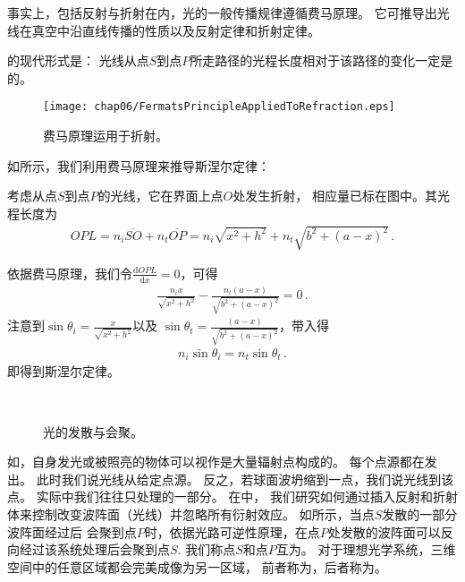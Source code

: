 事实上，包括反射与折射在内，光的一般传播规律遵循费马原理。
它可推导出光线在真空中沿直线传播的性质以及反射定律和折射定律。
\begin{proposition}
    的现代形式是：
    光线从点$S$到点$P$所走路径的光程长度相对于该路径的变化一定是的。
\end{proposition}

\begin{figure}[htbp]
    \centering\texttt{[image: chap06/FermatsPrincipleAppliedToRefraction.eps]}
    \caption{费马原理运用于折射。}
    \label{fig:6.28}
\end{figure}

如所示，我们利用费马原理来推导斯涅尔定律：
\begin{prove}\label{prove:FermatSnell}
    考虑从点$S$到点$P$的光线，它在界面上点$O$处发生折射，
    相应量已标在图中。其光程长度为
    \begin{align}
        OPL=n_i\overline{SO}+n_t\overline{OP}=n_i\sqrt{x^2+h^2}+n_t\sqrt{b^2+(a-x)^2}\, .
    \end{align}

    依据费马原理，我们令$\displaystyle\frac{\mathrm{d}OPL}{\mathrm{d}x}=0$，可得
    \begin{align}
        \frac{n_ix}{\sqrt{x^2+h^2}}-\frac{n_t(a-x)}{\sqrt{b^2+(a-x)^2}}=0\, .
    \end{align}
    注意到$\displaystyle\sin\theta_i=\frac{x}{\sqrt{x^2+h^2}}$以及
    $\displaystyle\sin\theta_t=\frac{(a-x)}{\sqrt{b^2+(a-x)^2}}$，带入得
    \begin{align}
        n_i\sin\theta_i=n_t\sin\theta_t\, .
    \end{align}
    即得到斯涅尔定律。
\end{prove}

\begin{figure}[htbp]
    \centering
    \,
    \caption{光的发散与会聚。}
    \label{fig:6.29}
\end{figure}

如，自身发光或被照亮的物体可以视作是大量辐射点构成的。
每个点源都在发出。
此时我们说光线从给定点源。
反之，若球面波坍缩到一点，我们说光线到该点。
实际中我们往往只处理的一部分。
在中，
我们研究如何通过插入反射和折射体来控制改变波阵面（光线）并忽略所有衍射效应。
如所示，当点$S$发散的一部分波阵面经过后
会聚到点$P$时，依据光路可逆性原理，在点$P$处发散的波阵面可以反向经过该系统处理后会聚到点$S$.
我们称点$S$和点$P$互为。
对于理想光学系统，三维空间中的任意区域都会完美成像为另一区域，
前者称为，后者称为。

